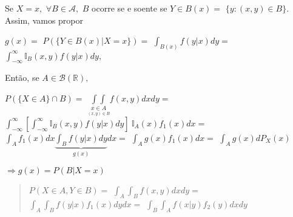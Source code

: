 \documentclass[
]{book}
\begin{document}
Se \(X=x,\) \(\forall B \in \mathcal{A},\) \(B\) ocorre se e soente se \(Y \in B(x)=\) \(\{y:(x,y) \in B\}.\) Assim, vamos propor

\(g(x)=\) \(P(\{Y \in B(x)|X=x\})=\) \(\int_{B(x)}f(y|x)dy=\) \(\int_{-\infty}^\infty \mathbb{I}_B(x,y)f(y|x)dy,\)

Então, se \(A \in \mathcal{B}(\mathbb{R}),\)

\(P(\{X \in A\}\cap B)=\) \(\underset{\underset{(x,y)\in B}{x\in A}}{\int \int}f(x,y)dxdy=\) \(\int_{-\infty}^{\infty}\left[\int_{-\infty}^{\infty}\mathbb{I}_B(x,y)f(y|x)dy\right]~\mathbb{I}_A(x)f_1(x)dx=\) \(\int_Af_1(x)dx\underbrace{\int_Bf(y|x)dy}_{g(x)}dx=\) \(\int_Ag(x)f_1(x)dx=\) \(\int_Ag(x)dP_X(x)\)

\(\Rightarrow g(x)=P(B|X=x)\)

\begin{quote}
\(P(X\in A,Y \in B)=\) \(\int_A \int_Bf(x,y)dxdy=\) \(\int_A \int_Bf(y|x)f_1(x)dydx=\) \(\int_B \int_Af(x|y)f_2(y)dxdy\)
\end{quote}

  
\end{document}
